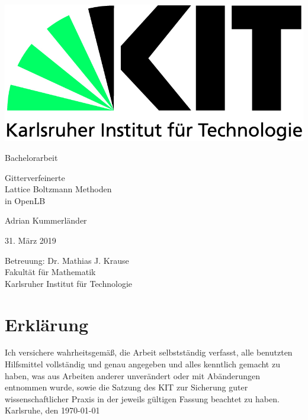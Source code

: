 \documentclass[12pt,a4paper]{scrartcl}
\begin{document}
\pagestyle{empty}
\begin{titlepage}

\includegraphics[scale=0.45]{img/kit-logo.jpg}
\vspace*{2cm}

\begin{center} \large
Bachelorarbeit
\vspace*{2cm}

{\huge Gitterverfeinerte \\ Lattice Boltzmann Methoden \\ in OpenLB \\}
\vspace*{2.5cm}

Adrian Kummerländer
\vspace*{1.5cm}

31. März 2019
\vspace*{3cm}

Betreuung: Dr. Mathias J. Krause \\[1cm]
Fakultät für Mathematik \\[1cm]
Karlsruher Institut für Technologie
\end{center}

\end{titlepage}

\tableofcontents
\newpage

\pagestyle{headings}



\newpage
\listoffigures

\newpage
\printbibliography

\newpage
\thispagestyle{empty}
\vspace*{8cm}
\section*{Erkl\"arung}
Ich  versichere  wahrheitsgem\"a\ss,  die  Arbeit selbstst\"andig verfasst,  alle  benutzten  Hilfsmittel  vollst\"andig  und  genau  angegeben  und  alles kenntlich  gemacht  zu  haben,  was  aus  Arbeiten  anderer  unver\"andert  oder  mit  Ab\"anderungen entnommen  wurde,  sowie die Satzung  des  KIT  zur  Sicherung guter wissenschaftlicher Praxis in der jeweils g\"ultigen Fassung beachtet zu haben.
\\[2ex]
\noindent
Karlsruhe, den \today\\[5ex]
\end{document}

